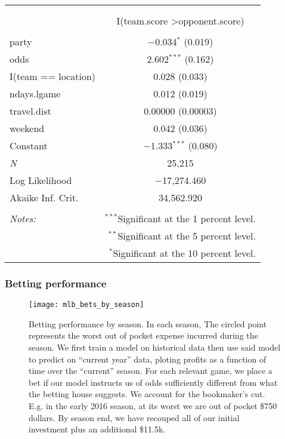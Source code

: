 \documentclass[letterpaper,12pt]{article}
\begin{document}
\begin{center}
    \begin{tabular}{@{\extracolsep{5pt}}lc}  \\[-1.8ex]\hline  \hline \\[-1.8ex]  \\[-1.8ex] & I(team.score \textgreater  opponent.score) \\  \hline \\[-1.8ex]   party & $-$0.034$^{*}$ (0.019) \\    odds & 2.602$^{***}$ (0.162) \\    I(team == location) & 0.028 (0.033) \\    ndays.lgame & 0.012 (0.019) \\    travel.dist & 0.00000 (0.00003) \\    weekend & 0.042 (0.036) \\    Constant & $-$1.333$^{***}$ (0.080) \\   \textit{N} & 25,215 \\  Log Likelihood & $-$17,274.460 \\  Akaike Inf. Crit. & 34,562.920 \\  \hline  \hline \\[-1.8ex]  \textit{Notes:} & \multicolumn{1}{r}{$^{***}$Significant at the 1 percent level.} \\   & \multicolumn{1}{r}{$^{**}$Significant at the 5 percent level.} \\   & \multicolumn{1}{r}{$^{*}$Significant at the 10 percent level.} \\ \end{tabular}  
\end{center}


\subsubsection{Betting performance}
\begin{figure}[!h]
  \centering
  \texttt{[image: mlb\_bets\_by\_season]}
  \caption{Betting performance by season. In each season, The 
    circled point represents the worst out of pocket expense incurred during the season.
    We first train a model on historical data then use said model to predict on ``current year''
    data, ploting profits as a function of time over the ``current'' season. For each relevant
    game, we place a bet if our model instructs us of odds sufficiently different from what
    the betting house suggests. We account for the bookmaker's cut. E.g. in the early 2016 season,
    at its worst we are out of pocket \$750 dollars. By season end, we have recouped all of
    our initial investment plus an additional \$11.5k.}
  \label{bettingperf}
\end{figure}
\end{document}
